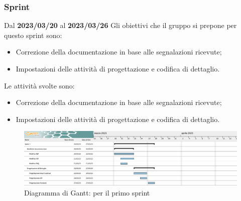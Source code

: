\subsubsection{ Sprint}
Dal \textbf{2023/03/20} al \textbf{2023/03/26}
\newline
Gli obiettivi che il gruppo si prepone per questo sprint sono:
\begin{itemize}
    \item Correzione della documentazione in base alle segnalazioni ricevute;
    \item Impostazioni delle attività di progettazione e codifica di dettaglio.
\end{itemize}
Le attività svolte sono:
\begin{itemize}
    \item Correzione della documentazione in base alle segnalazioni ricevute;
    \item Impostazioni delle attività di progettazione e codifica di dettaglio.
\end{itemize}
\begin{figure}[H]
    \centering
    \includegraphics[scale=0.32]{src/img/GanttSprint1.png}
    \caption{Diagramma di Gantt: per il primo sprint}
\end{figure}
